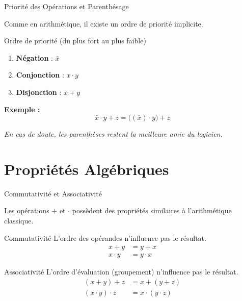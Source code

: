 \begin{frame}{Priorité des Opérations et Parenthésage}

    Comme en arithmétique, il existe un ordre de priorité implicite.

    \vspace{0.5cm}

    \begin{block}{Ordre de priorité (du plus fort au plus faible)}
        \begin{enumerate}
            \item \textbf{Négation} : \(\bar{x}\)
            \item \textbf{Conjonction} : \(x \cdot y\)
            \item \textbf{Disjonction} : \(x + y\)
        \end{enumerate}
    \end{block}

    \vspace{0.4cm}

    \textbf{Exemple :}
    \[
        \bar{x} \cdot y + z = \big((\bar{x}) \cdot y\big) + z
    \]

    \vspace{0.2cm}
    \centering
    \textit{En cas de doute, les parenthèses restent la meilleure amie du logicien.}

\end{frame}

\section{Propriétés Algébriques}

\begin{frame}{Commutativité et Associativité}

    Les opérations \(+\) et \(\cdot\) possèdent des propriétés similaires à l'arithmétique classique.

    \vspace{0.4cm}

    \begin{block}{Commutativité}
        L'ordre des opérandes n'influence pas le résultat.
        \begin{align*}
            x + y &= y + x \\
            x \cdot y &= y \cdot x
        \end{align*}
    \end{block}

    \begin{block}{Associativité}
        L'ordre d'évaluation (groupement) n'influence pas le résultat.
        \begin{align*}
            (x + y) + z &= x + (y + z) \\
            (x \cdot y) \cdot z &= x \cdot (y \cdot z)
        \end{align*}
    \end{block}

\end{frame}


